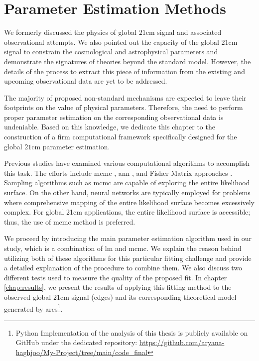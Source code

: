 \documentclass[12pt, TexShade, letterpaper]{report}
\begin{document}
\chapter{Parameter Estimation Methods}
\label{chap:method}
We formerly discussed the physics of global $\mathrm{21cm}$ signal and associated observational attempts. We also pointed out the capacity of the global $\mathrm{21cm}$ signal to constrain the cosmological and astrophysical parameters and demonstrate the signatures of theories beyond the standard model. However, the details of the process to extract this piece of information from the existing and upcoming observational data are yet to be addressed. \par
The majority of proposed non-standard mechanisms are expected to leave their footprints on the value of physical parameters. Therefore, the need to perform proper parameter estimation on the corresponding observational data is undeniable. Based on this knowledge, we dedicate this chapter to the construction of a firm computational framework specifically designed for the global $\mathrm{21cm}$ parameter estimation. \par
Previous studies have examined various computational algorithms to accomplish this task. The efforts include \gls{mcmc} \cite{pe_mcmc_1, pe_mcmc_2}, \gls{ann} \cite{pe_nn_1}, and Fisher Matrix approaches \cite{pe_fisher_2}. Sampling algorithms such as \gls{mcmc} are capable of exploring the entire likelihood surface. On the other hand, neural networks are typically employed for problems where comprehensive mapping of the entire likelihood surface becomes excessively complex. For global 21cm applications, the entire likelihood surface is accessible; thus, the use of \gls{mcmc} method is preferred.\par
We proceed by introducing the main parameter estimation algorithm used in our study, which is a combination of \gls{lm} and \gls{mcmc}. We explain the reason behind utilizing both of these algorithms for this particular fitting challenge and provide a detailed explanation of the procedure to combine them. We also discuss two different tests used to measure the quality of the proposed fit. In chapter \ref{chap:results}, we present the results of applying this fitting method to the observed global $\mathrm{21cm}$ signal (\gls{edges}) and its corresponding theoretical model generated by \gls{ares}\footnote{Python Implementation of the analysis of this thesis is publicly available on GitHub under the dedicated repository: 
\href{https://github.com/aryana-haghjoo/My-Project/tree/main/code_final}{https://github.com/aryana-haghjoo/My-Project/tree/main/code\_final}}.\par
\end{document}
